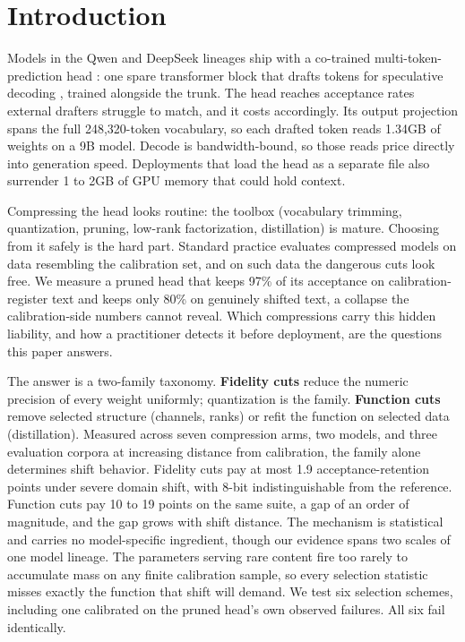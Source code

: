 \documentclass{article}
\begin{document}
\section{Introduction}
\label{sec:intro}

Models in the Qwen and DeepSeek lineages ship with a co-trained multi-token-prediction head \cite{gloeckle2024better,deepseek2024v3}: one spare transformer block that drafts tokens for speculative decoding \cite{leviathan2023fast,chen2023accelerating}, trained alongside the trunk. The head reaches acceptance rates external drafters struggle to match, and it costs accordingly. Its output projection spans the full 248,320-token vocabulary, so each drafted token reads 1.34GB of weights on a 9B model. Decode is bandwidth-bound, so those reads price directly into generation speed. Deployments that load the head as a separate file also surrender 1 to 2GB of GPU memory that could hold context.

Compressing the head looks routine: the toolbox (vocabulary trimming, quantization, pruning, low-rank factorization, distillation) is mature. Choosing from it safely is the hard part. Standard practice evaluates compressed models on data resembling the calibration set, and on such data the dangerous cuts look free. We measure a pruned head that keeps 97\% of its acceptance on calibration-register text and keeps only 80\% on genuinely shifted text, a collapse the calibration-side numbers cannot reveal. Which compressions carry this hidden liability, and how a practitioner detects it before deployment, are the questions this paper answers.

The answer is a two-family taxonomy. \textbf{Fidelity cuts} reduce the numeric precision of every weight uniformly; quantization is the family. \textbf{Function cuts} remove selected structure (channels, ranks) or refit the function on selected data (distillation). Measured across seven compression arms, two models, and three evaluation corpora at increasing distance from calibration, the family alone determines shift behavior. Fidelity cuts pay at most 1.9 acceptance-retention points under severe domain shift, with 8-bit indistinguishable from the reference. Function cuts pay 10 to 19 points on the same suite, a gap of an order of magnitude, and the gap grows with shift distance. The mechanism is statistical and carries no model-specific ingredient, though our evidence spans two scales of one model lineage. The parameters serving rare content fire too rarely to accumulate mass on any finite calibration sample, so every selection statistic misses exactly the function that shift will demand. We test six selection schemes, including one calibrated on the pruned head's own observed failures. All six fail identically.
\end{document}
